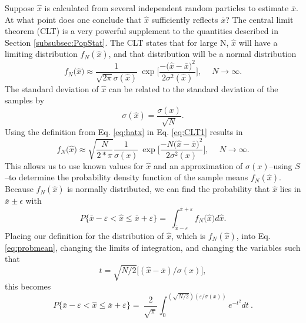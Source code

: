 Suppose $\hat{x}$ is calculated from several independent random particles
to estimate $\bar{x}$. At what point does one conclude that $\hat{x}$ sufficiently
reflects $\bar{x}$?
The central limit theorem (CLT) \cite{lewis_computational_1984, mcnp_manual_v1}
is a very powerful supplement to the quantities
described in Section \ref{subsubsec:PopStat}. The CLT states that for large N,
$\hat{x}$ will have a limiting distribution $f_N(\hat{x})$, and that distribution will be a
normal distribution
\begin{equation}
  f_N\big(\hat{x}\big) \approx \frac{1}{\sqrt{2\pi} \sigma(\hat{x})}\
           \exp\Bigg[ \frac{-\big( \hat{x}- \bar{x}\big)^2}{2\sigma^2(\hat{x})} \Bigg],\
           \quad N \rightarrow \infty.
  \label{eq:CLT1}
\end{equation}
The standard deviation of $\hat{x}$ can be related to the standard deviation of
the samples by
\begin{equation}
  \sigma(\hat{x}) = \frac{\sigma(x)}{\sqrt{N}}.
  \label{eq:hatx}
\end{equation}
Using the definition from Eq. \eqref{eq:hatx} in Eq. \eqref{eq:CLT1} results in
\begin{equation}
  f_N\big(\hat{x}\big) \approx \sqrt{\frac{N}{2*\pi}} \frac{1}{\sigma(x)}\
           \exp\Bigg[ \frac{-N\big( \hat{x}- \bar{x}\big)^2}{2\sigma^2(x)} \Bigg],\
           \quad N \rightarrow \infty .
  \label{eq:CLT2}
\end{equation}
This allows us to use known values for $\hat{x}$ and an approximation of
$\sigma(x)$--using $S$--to determine the probability density function of the
sample means
$f_N(\hat{x})$. Because $f_N(\hat{x})$ is normally distributed, we can find the
probability that $\hat{x}$ lies in $\bar{x} \pm \epsilon$ with
\begin{equation}
  P\big\{\bar{x} - \varepsilon < \hat{x} \leq \bar{x} + \varepsilon\big\} = \
   \int_{\bar{x}-\varepsilon}^{\bar{x}+\varepsilon}f_N\big( \hat{x} \big) d\hat{x}.
   \label{eq:probmean}
\end{equation}
Placing our definition for the distribution of $\hat{x}$, which is $f_N(\hat{x})$, into Eq.
\eqref{eq:probmean}, changing the limits of integration, and changing the
variables such that
\begin{equation*}
  t = \sqrt{N/2}\big[(\hat{x}-\bar{x})/\sigma(x)\big],
\end{equation*}
this becomes
\begin{equation}
  P\big\{\bar{x} - \varepsilon < \hat{x} \leq \bar{x} + \varepsilon\big\} = \
  \frac{2}{\sqrt{\pi}} \int_0^{(\sqrt{N/2})(\varepsilon/\sigma(x))} e^{-t^2} dt
  \:.
  \label{eq:bigP}
\end{equation}
